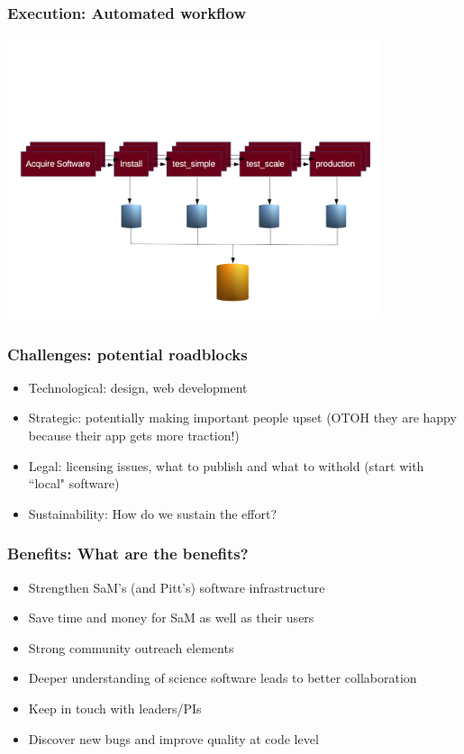 \documentclass[hyperref={pdfpagelabels=false},12pt]{beamer}
\begin{document}
\begin{frame}
\frametitle{Execution: Automated workflow}
\begin{center}
\includegraphics[width=11cm]{workflow}
\end{center}
\end{frame}

\begin{frame}
\frametitle{Challenges: potential roadblocks}
\begin{itemize}
\itemsep1em
\item
Technological: design, web development
\item 
Strategic: potentially making important people upset (OTOH they are happy because their app gets more traction!)
\item
Legal: licensing issues, what to publish and what to withold (start with ``local" software)
\item
 Sustainability: How do we sustain the effort?
\end{itemize}
\end{frame}

\begin{frame}
\frametitle{Benefits: What are the benefits?}
\begin{itemize}
\itemsep1em
\item Strengthen SaM's (and Pitt's) software infrastructure
\item
Save time and money for SaM as well as their users
\item
Strong community outreach elements
\item
Deeper understanding of science software leads to better collaboration
\item
Keep in touch with leaders/PIs 
\item
Discover new bugs and improve quality at code level
\end{itemize}
\end{frame}
\end{document}

